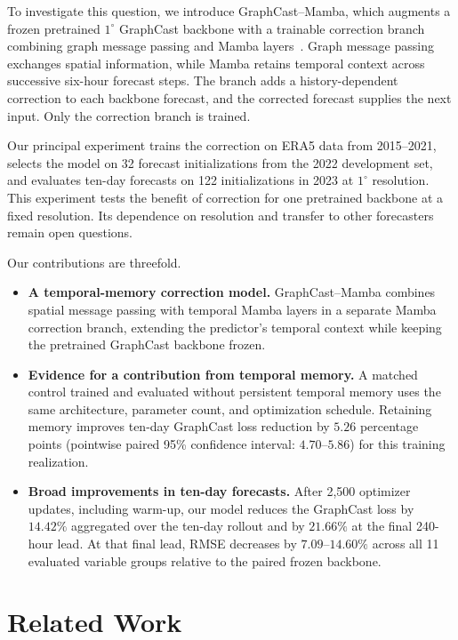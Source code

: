\documentclass[11pt]{article}
\begin{document}
{To investigate this question, we introduce GraphCast--Mamba, which augments a frozen pretrained $1^\circ$ GraphCast backbone with a trainable correction branch combining graph message passing and Mamba layers~\citep{lam2023graphcast,gu2023mamba}. Graph message passing exchanges spatial information, while Mamba retains temporal context across successive six-hour forecast steps. The branch adds a history-dependent correction to each backbone forecast, and the corrected forecast supplies the next input. Only the correction branch is trained.}

{Our principal experiment trains the correction on ERA5 data from 2015--2021, selects the model on 32 forecast initializations from the 2022 development set, and evaluates ten-day forecasts on 122 initializations in 2023 at $1^\circ$ resolution.} This experiment tests the benefit of correction for one pretrained backbone at a fixed resolution. Its dependence on resolution and transfer to other forecasters remain open questions.

Our contributions are threefold.
\begin{itemize}
    \item \textbf{A temporal-memory correction model.} GraphCast--Mamba combines spatial message passing with temporal Mamba layers in a separate Mamba correction branch, extending the predictor's temporal context while keeping the pretrained GraphCast backbone frozen.
    \item \textbf{Evidence for a contribution from temporal memory.} A matched control trained and evaluated without persistent temporal memory uses the same architecture, parameter count, and optimization schedule. Retaining memory improves ten-day GraphCast loss reduction by $5.26$ percentage points (pointwise paired 95\% confidence interval: $4.70$--$5.86$) for this training realization.
    \item {\textbf{Broad improvements in ten-day forecasts.} After 2,500 optimizer updates, including warm-up, our model reduces the {GraphCast loss} by $14.42\%$ aggregated over the ten-day rollout and by $21.66\%$ at the final 240-hour lead.} {At that final lead, RMSE decreases by $7.09$--$14.60\%$ across all 11 evaluated variable groups relative to the paired frozen backbone.}
\end{itemize}

\begingroup
\section{Related Work}
\label{sec:related_work}
\end{document}

